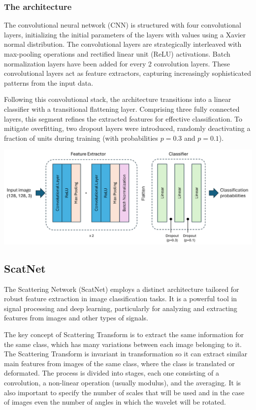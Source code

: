\documentclass[11pt]{article}
\newenvironment{Figure}
  {\par\medskip\noindent\minipage{\linewidth}}
  {\endminipage\par\medskip}
\begin{document}
\begin{multicols*}{2}
\subsubsection{The architecture}
The convolutional neural network (CNN) is structured with four convolutional layers, initializing the initial parameters of the layers with values using a Xavier normal distribution. The convolutional layers are strategically interleaved with max-pooling operations and rectified linear unit (ReLU) activations. Batch normalization layers have been added for every 2 convolution layers. These convolutional layers act as feature extractors, capturing increasingly sophisticated patterns from the input data.

Following this convolutional stack, the architecture transitions into a linear classifier with a transitional flattening layer. Comprising three fully connected layers, this segment refines the extracted features for effective classification. To mitigate overfitting, two dropout layers were introduced, randomly deactivating a fraction of units during training (with probabilities $p=0.3$ and $p=0.1$).

\begin{Figure}
    \centering
    \includegraphics[width=\linewidth]{images/cnn_architecture.png}
    \label{fig:cnn-architecture}
\end{Figure}


\subsection{ScatNet}
The Scattering Network (ScatNet) employs a distinct architecture tailored for robust feature extraction in image classification tasks. It is a powerful tool in signal processing and deep learning, particularly for analyzing and extracting features from images and other types of signals.

The key concept of Scattering Transform is to extract the same information for the same class, which has many variations between each image belonging to it. The Scattering Transform is invariant in transformation so it can extract similar main features from images of the same class, where the class is translated or deformated. The process is divided into stages, each one consisting of a convolution, a non-linear operation (usually modulus), and the averaging. It is also important to specify the number of scales that will be used and in the case of images even the number of angles in which the wavelet will be rotated.


\end{multicols*}
\end{document}
